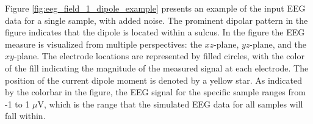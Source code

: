 \documentclass[a4paper, UKenglish, 11pt]{uiomaster}
\begin{document}
Figure \ref{fig:eeg_field_1_dipole_example} presents an example of the input EEG data for a single sample, with added noise. The prominent dipolar pattern in the figure indicates that the dipole is located within a sulcus. In the figure the EEG measure is visualized from multiple perspectives: the $xz$-plane, $yz$-plane, and the $xy$-plane. The electrode locations are represented by filled circles, with the color of the fill indicating the magnitude of the measured signal at each electrode. The position of the current dipole moment is denoted by a yellow star. As indicated by the colorbar in the figure, the EEG signal for the specific sample ranges from -1 to 1 $\mu$V, which is the range that the simulated EEG data for all samples will fall within.



%
\end{document}
